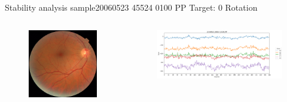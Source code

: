 \documentclass{beamer}
\begin{document}
\begin{frame}{Stability analysis sample}{20060523 45524 0100 PP Target: 0 Rotation}
\begin{columns}
	\begin{column}{0.3\textwidth}
		\begin{figure}[p]
			\centering
			\includegraphics[width=\textwidth]{chapter_stability/20060523_45524_0100_PP/20060523_45524_0100_PP.jpeg}
		\end{figure}	
	\end{column}
	\begin{column}{0.45\textwidth}  %
		\begin{figure}[p]
			\centering
			\includegraphics[width=\textwidth]{chapter_stability/20060523_45524_0100_PP/r/scores.png}
		\end{figure}
		\centering
		\href{run:videos_stability/Messidor_20060523_45524_0100_PP_Target_0_Checking_Rotation_Sensitivity.mp4}{\color{blue}{Rotation Visualization}} 
	\end{column}
\end{columns}
\end{frame}
\end{document}

